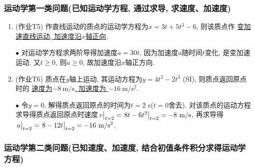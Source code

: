\subsubsection{运动学第一类问题(已知运动学方程, 通过求导, 求速度、加速度)}

\begin{enumerate}
	
	\item (作业T5) 作直线运动的质点的运动学方程为$x = 3t + 5t^3 - 6$, 则该质点作 \uline{变加速直线运动, 加速度沿$x$轴正向}. 
	
	\vskip 0.1cm
	
	\begin{solution}
		$\bullet$ 对运动学方程求两阶导得加速度$a = 30t$, 因为加速度$a$随时间$t$变化, 是变加速运动. 又$t \geqslant 0$, 则$a \geqslant 0$, 故加速度沿$x$轴正方向. 
	\end{solution}
	
	\vskip 0.3cm
	
	\item (作业T6) 质点在$y$轴上运动, 其运动方程为$y = 4t^2 - 2t^3$ (SI), 则质点返回原点时的 \uline{速度为$-8 \mathrm{~m}/\mathrm{s}$, 加速度为 $-16 \mathrm{~m}/\mathrm{s}^2$}. 
	
	\vskip 0.1cm
	
	\begin{solution}
		$\bullet$ 令$y = 0$, 解得质点返回原点的时间为$t = 2$ s($t = 0$舍去). 对该质点的运动方程求导得质点返回原点时速度$\eval{v}_{t=2} = \eval{8t - 6t^2}_{t=2} = -8 \mathrm{~m}/\mathrm{s}$, 再求导得$\eval{a}_{t=2} = \eval{8 - 12t}_{t=2} = -16 \mathrm{~m}/\mathrm{s}^2$. 
	\end{solution}
	
\end{enumerate}

\subsubsection{运动学第二类问题(已知速度、加速度, 结合初值条件积分求得运动学方程)}

